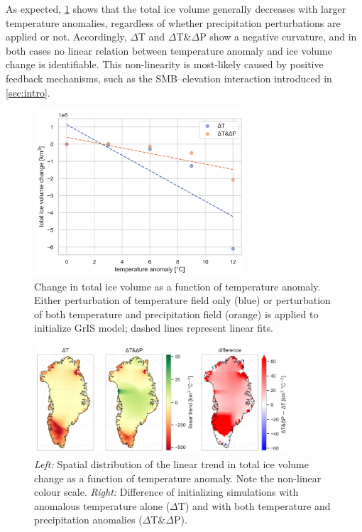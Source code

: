 As expected, \cref{fig:anom-scatter} shows that the total ice volume generally decreases with larger temperature anomalies, regardless of whether precipitation perturbations are applied or not. Accordingly, \(\Delta\)T and \(\Delta\)T\&\(\Delta\)P show a negative curvature, and in both cases no linear relation between temperature anomaly and ice volume change is identifiable. This non-linearity is most-likely caused by positive feedback mechanisms, such as the SMB–elevation interaction introduced in \cref{sec:intro}.

\begin{figure}
	\centering
	\includegraphics[width=0.7\textwidth]{../climate-anomalies/figs/icevol-deltat.png}
	\caption{Change in total ice volume as a function of temperature anomaly. Either perturbation of temperature field only (blue) or perturbation of both temperature and precipitation field (orange) is applied to initialize GrIS model; dashed lines represent linear fits.}
	\label{fig:anom-scatter}
\end{figure}

\begin{figure}
	\centering
	\includegraphics[width=0.85\textwidth]{../climate-anomalies/figs/linear-trend.png}
	\caption{\textit{Left:} Spatial distribution of the linear trend in total ice volume change as a function of temperature anomaly. Note the non-linear colour scale. \textit{Right:} Difference of initializing simulations with anomalous temperature alone (\(\Delta\)T) and with both temperature and precipitation anomalies (\(\Delta\)T\&\(\Delta\)P).}
	\label{fig:anom-maps}
\end{figure}


